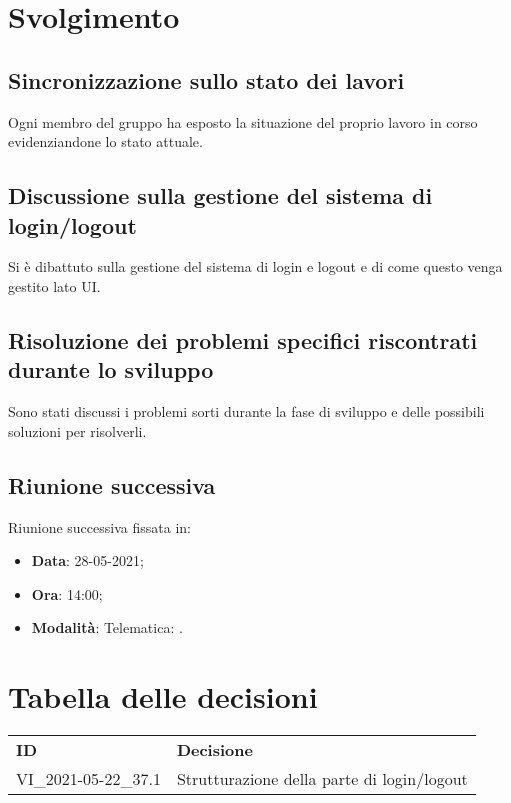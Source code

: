 \documentclass[]{article}
\begin{document}
	\newpage

	\section{Svolgimento}
		\subsection{Sincronizzazione sullo stato dei lavori}
		Ogni membro del gruppo ha esposto la situazione del proprio lavoro in corso evidenziandone lo stato attuale.\\

		\subsection{Discussione sulla gestione del sistema di login/logout}
		Si è dibattuto sulla gestione del sistema di login e logout e di come questo venga gestito lato UI. \\

		\subsection{Risoluzione dei problemi specifici riscontrati durante lo sviluppo}
		Sono stati discussi i problemi sorti durante la fase di sviluppo e delle possibili soluzioni per risolverli. \\

		\subsection{Riunione successiva}
		Riunione successiva fissata in:
		\begin{itemize}
			\item \textbf{Data}: 28-05-2021;
			\item \textbf{Ora}: 14:00;
			\item \textbf{Modalità}: Telematica: .
		\end{itemize}


\section{Tabella delle decisioni}

\begin{table} [h!]
	\begin{center}
		\begin{tabular} { m{2cm} m{14cm} }
			\rowcolor{lightgray}
			\textbf{ID} & \textbf{Decisione}\\
			VI\_2021-05-22\_37.1 & Strutturazione della parte di login/logout \glock{Typescript} \\
		\end{tabular}
	\end{center}
\end{table}
\end{document}
